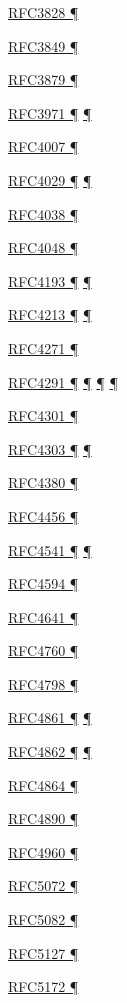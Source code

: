 \documentclass[
]{article}
\begin{document}
\hyperref[transport-protocols]{RFC3828 ¶}

\hyperref[addresses]{RFC3849 ¶}

\hyperref[addresses]{RFC3879 ¶}

\hyperref[security]{RFC3971 ¶} \hyperref[layer-2-considerations]{¶}

\hyperref[addresses]{RFC4007 ¶}

\hyperref[layer-2-functions]{RFC4029 ¶} \hyperref[tunnels]{¶}

\hyperref[addresses]{RFC4038 ¶}

\hyperref[addresses]{RFC4048 ¶}

\hyperref[filtering]{RFC4193 ¶} \hyperref[multihoming]{¶}

\hyperref[dual-stack-scenarios]{RFC4213 ¶} \hyperref[tunnels]{¶}

\hyperref[routing]{RFC4271 ¶}

\hyperref[address-resolution]{RFC4291 ¶} \hyperref[addresses]{¶}
\hyperref[filtering]{¶} \hyperref[markdown-usage]{¶}

\hyperref[security]{RFC4301 ¶}

\hyperref[extension-headers-and-options]{RFC4303 ¶}
\hyperref[packet-format]{¶}

\hyperref[obsolete-techniques]{RFC4380 ¶}

\hyperref[routing]{RFC4456 ¶}

\hyperref[address-resolution]{RFC4541 ¶}
\hyperref[layer-2-considerations]{¶}

\hyperref[traffic-class-and-flow-label]{RFC4594 ¶}

\hyperref[filtering]{RFC4641 ¶}

\hyperref[routing]{RFC4760 ¶}

\hyperref[tunnels]{RFC4798 ¶}

\hyperref[address-resolution]{RFC4861 ¶}
\hyperref[auto-configuration]{¶}

\hyperref[auto-configuration]{RFC4862 ¶}
\hyperref[address-and-prefix-management]{¶}

\hyperref[topology-obfuscation]{RFC4864 ¶}

\hyperref[filtering]{RFC4890 ¶}

\hyperref[transport-protocols]{RFC4960 ¶}

\hyperref[layer-2-functions]{RFC5072 ¶}

\hyperref[filtering]{RFC5082 ¶}

\hyperref[traffic-class-and-flow-label]{RFC5127 ¶}

\hyperref[layer-2-functions]{RFC5172 ¶}
\end{document}
